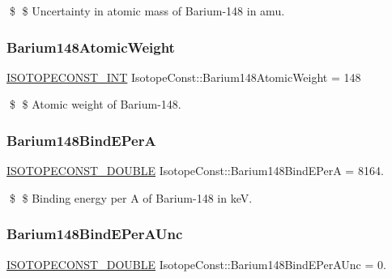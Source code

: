 \$ \$ Uncertainty in atomic mass of Barium-\/148 in amu. \mbox{\label{group___isotope_const-_barium-_ba148_ga41c652b0c6d93821a20a52d16bbd4d70}} 
\subsubsection{\texorpdfstring{Barium148\+Atomic\+Weight}{Barium148AtomicWeight}}
{\footnotesize\ttfamily \mbox{\hyperlink{group___isotope_const-_macros_ga5f18360b3e99483a35c32d789e62621c}{I\+S\+O\+T\+O\+P\+E\+C\+O\+N\+S\+T\+\_\+\+I\+NT}} Isotope\+Const\+::\+Barium148\+Atomic\+Weight = 148}

\$ \$ Atomic weight of Barium-\/148. \mbox{\label{group___isotope_const-_barium-_ba148_ga7c29406ea788fb5f1631b308c4752879}} 
\subsubsection{\texorpdfstring{Barium148\+Bind\+E\+PerA}{Barium148BindEPerA}}
{\footnotesize\ttfamily \mbox{\hyperlink{group___isotope_const-_macros_ga8f45a7272ce02c0b4c65c44636ed719a}{I\+S\+O\+T\+O\+P\+E\+C\+O\+N\+S\+T\+\_\+\+D\+O\+U\+B\+LE}} Isotope\+Const\+::\+Barium148\+Bind\+E\+PerA = 8164.}

\$ \$ Binding energy per A of Barium-\/148 in keV. \mbox{\label{group___isotope_const-_barium-_ba148_ga250de332be30ca3d73ac571b0db26a70}} 
\subsubsection{\texorpdfstring{Barium148\+Bind\+E\+Per\+A\+Unc}{Barium148BindEPerAUnc}}
{\footnotesize\ttfamily \mbox{\hyperlink{group___isotope_const-_macros_ga8f45a7272ce02c0b4c65c44636ed719a}{I\+S\+O\+T\+O\+P\+E\+C\+O\+N\+S\+T\+\_\+\+D\+O\+U\+B\+LE}} Isotope\+Const\+::\+Barium148\+Bind\+E\+Per\+A\+Unc = 0.}

